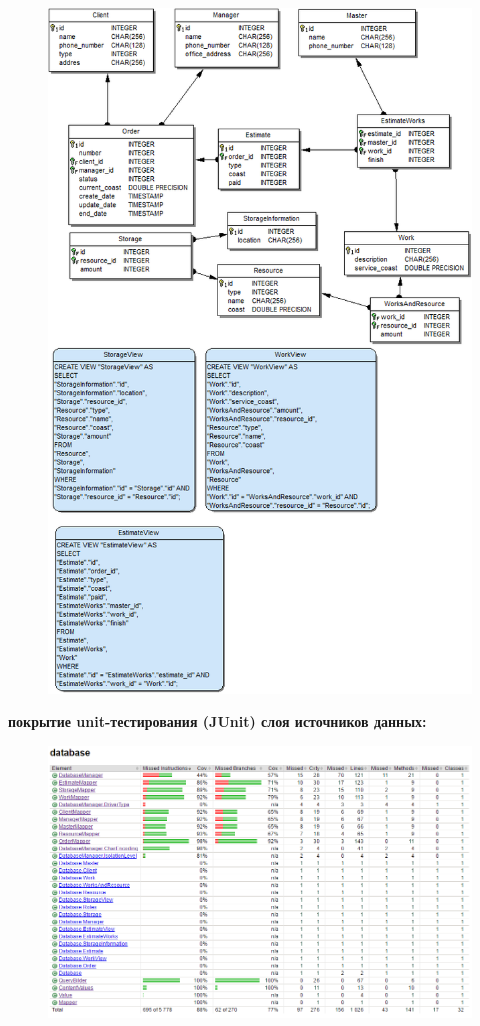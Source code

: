 \documentclass[12pt,a4paper,titlepage]{article}
\begin{document}
\begin{figure}[!ht]
\includegraphics[scale=0.6]{images/database.png}\caption{}
\end{figure}
\newpage
\textbf{покрытие unit-тестирования (JUnit) слоя источников данных:}
\begin{figure}[!ht]
\includegraphics[scale=0.6]{images/databaseJUnitTest.png}\caption{}
\end{figure}
\end{document}
